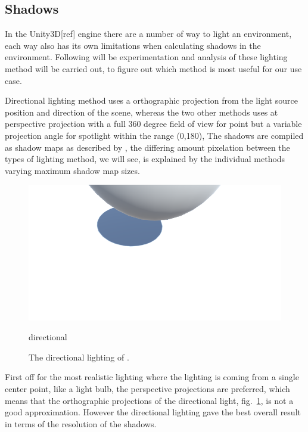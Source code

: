 \subsection{Shadows}\label{sec:shadowsexperiment}

In the Unity3D[ref] engine there are a number of way to light an environment, each way also has its own limitations when calculating shadows in the environment. Following will be experimentation and analysis of these lighting method will be carried out, to figure out which method is most useful for our use case. 


Directional lighting method uses a orthographic projection from the light source position and direction of the scene, whereas the two other methods uses at perspective projection with a full 360 degree field of view for point but a variable projection angle for spotlight within the range (0,180), The shadows are compiled as shadow maps as described by \cite{Wimmer2004}, the differing amount pixelation between the types of lighting method, we will see, is explained by the individual methods varying maximum shadow map sizes\cite{unityshadowmapsize}.

\begin{figure}
\centering
\includegraphics[width=\linewidth]{figures/shadows/directional-cleaned}
\caption{directional}
\label{fig:directional}
\caption{
The directional lighting of \cite{unitylighttypes}.
}
\end{figure}

First off for the most realistic lighting where the lighting is coming from a single center point, like a light bulb, the perspective projections are preferred\cite{unitylighttypes}, which means that the orthographic projections of the directional light, fig.~\ref{fig:directional}, is not a good approximation. However the directional lighting gave the best overall result in terms of the resolution of the shadows.

